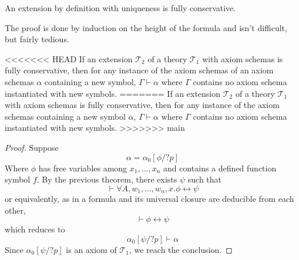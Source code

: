 \begin{thm}
An extension by definition with uniqueness is fully conservative.
\end{thm}
The proof is done by induction on the height of the formula and isn't difficult, but fairly tedious.
\begin{thm}
<<<<<<< HEAD
If an extension $\mathcal{T}_2$ of a theory $\mathcal{T}_1$ with axiom schemas is fully conservative, then for any instance of the axiom schemas of an axiom schemas $\alpha$ containing a new symbol, $\Gamma \vdash \alpha$ where $\Gamma$ contains no axiom schema instantiated with new symbols.
=======
If an extension $\mathcal{T}_2$ of a theory $\mathcal{T}_1$ with axiom schemas is fully conservative, then for any instance of the axiom schemas containing a new symbol $\alpha$, $\Gamma \vdash \alpha$ where $\Gamma$ contains no axiom schema instantiated with new symbols.
>>>>>>> main

\end{thm}
\begin{proof}
Suppose
$$
\alpha = \alpha_0[\phi / ?p]
$$
Where $\phi$ has free variables among $x_1,...,x_n$ and contains a defined function symbol $f$. By the previous theorem, there exists $\psi$ such that
$$\vdash \forall A, w_1, ..., w_n, x. \phi \leftrightarrow \psi$$
or equivalently, as in a formula and its universal closure are deducible from each other,
$$\vdash \phi \leftrightarrow \psi$$
which reduces to
$$
\alpha_0[\psi / ?p] \vdash \alpha
$$
Since $\alpha_0[\psi / ?p]$ is an axiom of $\mathcal{T}_1$, we reach the conclusion.
\end{proof}


